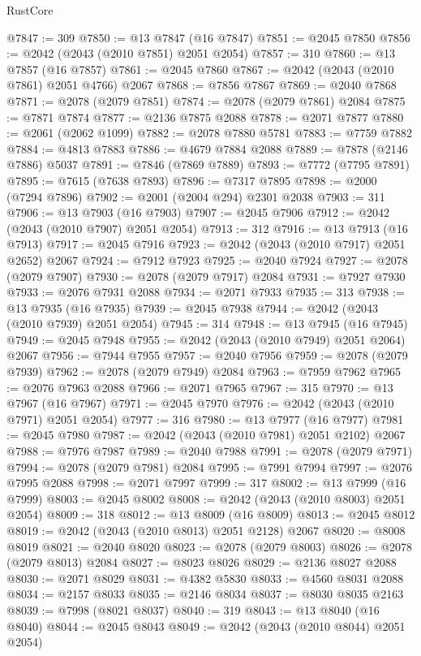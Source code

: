 \begin{lexlean}{RustCore}
\begin{coremodule}
@7847 := 309
@7850 := @13 @7847 (@16 @7847)
@7851 := @2045 @7850
@7856 := @2042 (@2043 (@2010 @7851) @2051 @2054)
@7857 := 310
@7860 := @13 @7857 (@16 @7857)
@7861 := @2045 @7860
@7867 := @2042 (@2043 (@2010 @7861) @2051 @4766) @2067
@7868 := @7856 @7867
@7869 := @2040 @7868
@7871 := @2078 (@2079 @7851)
@7874 := @2078 (@2079 @7861) @2084
@7875 := @7871 @7874
@7877 := @2136 @7875 @2088
@7878 := @2071 @7877
@7880 := @2061 (@2062 @1099)
@7882 := @2078 @7880 @5781
@7883 := @7759 @7882
@7884 := @4813 @7883
@7886 := @4679 @7884 @2088
@7889 := @7878 (@2146 @7886) @5037
@7891 := @7846 (@7869 @7889)
@7893 := @7772 (@7795 @7891)
@7895 := @7615 (@7638 @7893)
@7896 := @7317 @7895
@7898 := @2000 (@7294 @7896)
@7902 := @2001 (@2004 @294) @2301 @2038
@7903 := 311
@7906 := @13 @7903 (@16 @7903)
@7907 := @2045 @7906
@7912 := @2042 (@2043 (@2010 @7907) @2051 @2054)
@7913 := 312
@7916 := @13 @7913 (@16 @7913)
@7917 := @2045 @7916
@7923 := @2042 (@2043 (@2010 @7917) @2051 @2652) @2067
@7924 := @7912 @7923
@7925 := @2040 @7924
@7927 := @2078 (@2079 @7907)
@7930 := @2078 (@2079 @7917) @2084
@7931 := @7927 @7930
@7933 := @2076 @7931 @2088
@7934 := @2071 @7933
@7935 := 313
@7938 := @13 @7935 (@16 @7935)
@7939 := @2045 @7938
@7944 := @2042 (@2043 (@2010 @7939) @2051 @2054)
@7945 := 314
@7948 := @13 @7945 (@16 @7945)
@7949 := @2045 @7948
@7955 := @2042 (@2043 (@2010 @7949) @2051 @2064) @2067
@7956 := @7944 @7955
@7957 := @2040 @7956
@7959 := @2078 (@2079 @7939)
@7962 := @2078 (@2079 @7949) @2084
@7963 := @7959 @7962
@7965 := @2076 @7963 @2088
@7966 := @2071 @7965
@7967 := 315
@7970 := @13 @7967 (@16 @7967)
@7971 := @2045 @7970
@7976 := @2042 (@2043 (@2010 @7971) @2051 @2054)
@7977 := 316
@7980 := @13 @7977 (@16 @7977)
@7981 := @2045 @7980
@7987 := @2042 (@2043 (@2010 @7981) @2051 @2102) @2067
@7988 := @7976 @7987
@7989 := @2040 @7988
@7991 := @2078 (@2079 @7971)
@7994 := @2078 (@2079 @7981) @2084
@7995 := @7991 @7994
@7997 := @2076 @7995 @2088
@7998 := @2071 @7997
@7999 := 317
@8002 := @13 @7999 (@16 @7999)
@8003 := @2045 @8002
@8008 := @2042 (@2043 (@2010 @8003) @2051 @2054)
@8009 := 318
@8012 := @13 @8009 (@16 @8009)
@8013 := @2045 @8012
@8019 := @2042 (@2043 (@2010 @8013) @2051 @2128) @2067
@8020 := @8008 @8019
@8021 := @2040 @8020
@8023 := @2078 (@2079 @8003)
@8026 := @2078 (@2079 @8013) @2084
@8027 := @8023 @8026
@8029 := @2136 @8027 @2088
@8030 := @2071 @8029
@8031 := @4382 @5830
@8033 := @4560 @8031 @2088
@8034 := @2157 @8033
@8035 := @2146 @8034
@8037 := @8030 @8035 @2163
@8039 := @7998 (@8021 @8037)
@8040 := 319
@8043 := @13 @8040 (@16 @8040)
@8044 := @2045 @8043
@8049 := @2042 (@2043 (@2010 @8044) @2051 @2054)

\end{coremodule}
\end{lexlean}
